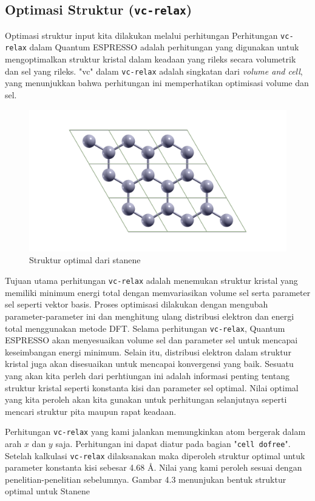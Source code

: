 \subsection{Optimasi Struktur (\texttt{vc-relax})}
Optimasi struktur input kita dilakukan melalui perhitungan Perhitungan \texttt{vc-relax} dalam Quantum ESPRESSO adalah perhitungan yang digunakan untuk mengoptimalkan struktur kristal dalam keadaan yang rileks secara volumetrik dan sel yang rileks. "vc" dalam \texttt{vc-relax} adalah singkatan dari \textit{volume and cell}, yang menunjukkan bahwa perhitungan ini memperhatikan optimisasi volume dan sel.
\begin{figure}
    \centering
    \includegraphics[width=15cm]{./gambar/pw.vc-relax.sn.png}
    \caption{Struktur optimal dari stanene}
    \label{fig:DensityofStates}
\end{figure}
Tujuan utama perhitungan \texttt{vc-relax} adalah menemukan struktur kristal yang memiliki minimum energi total dengan memvariasikan volume sel serta parameter sel seperti vektor basis. Proses optimisasi dilakukan dengan mengubah parameter-parameter ini dan menghitung ulang distribusi elektron dan energi total menggunakan metode DFT. Selama perhitungan \texttt{vc-relax}, Quantum ESPRESSO akan menyesuaikan volume sel dan parameter sel untuk mencapai keseimbangan energi minimum. Selain itu, distribusi elektron dalam struktur kristal juga akan disesuaikan untuk mencapai konvergensi yang baik. Sesuatu yang akan kita perleh dari perhtiungan ini adalah informasi penting tentang struktur kristal seperti konstanta kisi dan parameter sel optimal. Nilai optimal yang kita peroleh akan kita gunakan untuk perhitungan selanjutnya seperti mencari struktur pita maupun rapat keadaan.

Perhitungan \texttt{vc-relax} yang kami jalankan memungkinkan atom bergerak dalam arah $x$ dan $y$ saja. Perhitungan ini dapat diatur pada bagian "\texttt{cell dofree}". Setelah kalkulasi \texttt{vc-relax} dilaksanakan maka diperoleh struktur optimal untuk parameter konstanta kisi sebesar 4.68 \AA. Nilai yang kami peroleh sesuai dengan penelitian-penelitian sebelumnya. Gambar 4.3 menunjukan bentuk struktur optimal untuk Stanene


